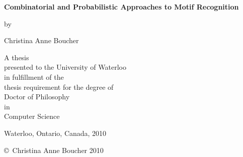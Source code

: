 \pagestyle{empty}

\renewcommand{\contentsname}{Table of Contents}

\begin{titlepage}
        \begin{center}
        \vspace*{1.0cm}

        \Huge
        {\bf Combinatorial and Probabilistic Approaches to Motif Recognition}

        \vspace*{1.0cm}

        \normalsize
        by \\

        \vspace*{1.0cm}

        \Large
        Christina Anne Boucher \\

        \vspace*{3.0cm}

        \normalsize
        A thesis \\
        presented to the University of Waterloo \\ 
        in fulfillment of the \\
        thesis requirement for the degree of \\
       	Doctor of Philosophy \\
        in \\
        Computer Science \\

        \vspace*{2.0cm}

        Waterloo, Ontario, Canada, 2010 \\

        \vspace*{1.0cm}

        \copyright\ Christina Anne Boucher 2010 \\
        \end{center}
\end{titlepage}

